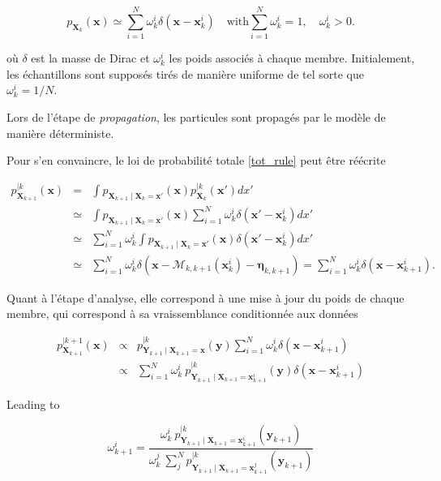 \begin{equation*}
    p_{\bm X_k}(\bm x) \simeq \sum_{i=1}^N \omega^i_k \delta(\bm x - \bm x_k^i) \quad \text{with} \sum_{i=1}^N \omega^i_k = 1, \quad \omega^i_k > 0.
\end{equation*}

où $\delta$ est la masse de Dirac et $\omega^i_k$ les poids associés à chaque membre. Initialement, les échantillons sont supposés tirés de manière uniforme de tel sorte que $\omega^i_k = 1/N$.

Lors de l'étape de \textit{propagation}, les particules sont propagés par le modèle de manière déterministe.

Pour s'en convaincre, le loi de probabilité totale \ref{tot_rule} peut être réécrite

\begin{eqnarray*}
    p_{\bm X_{k+1}}^{\mid k}(\bm x) &=& \int p_{\bm X_{k+1}\mid \bm X_{k} = \bm x'}(\bm x) p_{\bm X_{k}}^{\mid k}(\bm x')dx' \\
    &\simeq& \int p_{\bm X_{k+1}\mid \bm X_{k} = \bm x'}(\bm x) \sum_{i=1}^N \omega^i_k \delta(\bm x' - \bm x_k^i) dx' \\
    &\simeq& \sum_{i=1}^N \omega^i_k  \int p_{\bm X_{k+1}\mid \bm X_{k} = \bm x'}(\bm x) \delta(\bm x' - \bm x_k^i) dx' \\
    &\simeq& \sum_{i=1}^N \omega^i_k \delta(\bm x - \mathcal M_{k,k+1}(\bm x_k^i) - \bm \eta_{k,k+1}) = \sum_{i=1}^N \omega^i_k \delta(\bm x - \bm x_{k+1}^i).
\end{eqnarray*}

Quant à l'étape d'analyse, elle correspond à une mise à jour du poids de chaque membre, qui correspond à sa vraissemblance conditionnée aux données

\begin{eqnarray*}
    p_{\bm X_{k+1}}^{\mid k+1}(\bm x) &\propto& p_{\bm Y_{k+1} \mid \bm X_{k+1} = \bm x}^{\mid k}(\bm y)  \sum_{i=1}^N \omega^i_k \delta(\bm x - \bm x_{k+1}^i) \\
    &\propto& \sum_{i=1}^N  \omega^i_k~p_{\bm Y_{k+1} \mid \bm X_{k+1} = \bm x_{k+1}^i}^{\mid k}(\bm y)\delta(\bm x - \bm x_{k+1}^i)
\end{eqnarray*}

Leading to

\begin{equation*}
    \omega^i_{k+1}  = \frac{\omega^i_k~p_{\bm Y_{k+1} \mid \bm X_{k+1} = \bm x_{k+1}^i}^{\mid k}(\bm y_{k+1}) }{\omega^j_k~\sum_j^N p_{\bm Y_{k+1} \mid \bm X_{k+1} = \bm x_{k+1}^j}^{\mid k}(\bm y_{k+1}) }
\end{equation*}

